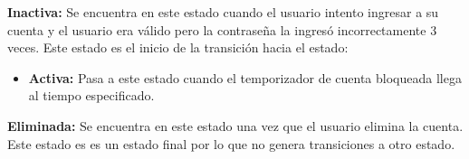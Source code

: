 \noindent \textbf{Inactiva:} Se encuentra en este estado cuando el usuario intento ingresar a su cuenta y el usuario era válido pero la contraseña la ingresó incorrectamente 3 veces. Este estado es el inicio de la transición hacia el estado:
\begin{itemize}
	
	\item \textbf{Activa:} Pasa a este estado cuando el temporizador de cuenta bloqueada llega al tiempo especificado.
	
\end{itemize}

\noindent \textbf{Eliminada:} Se encuentra en este estado una vez que el usuario elimina la cuenta. Este estado es es un estado final por lo que no genera transiciones a otro estado.

